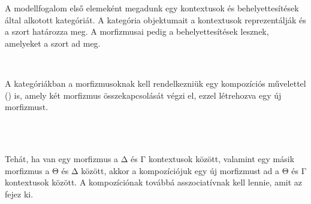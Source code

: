 A modellfogalom első elemeként megadunk egy kontextusok és behelyettesítések által alkotott kategóriát. A kategória objektumait a kontextusok reprezentálják és a  szort határozza meg. A morfizmusai pedig a behelyettesítések lesznek, amelyeket a  szort ad meg.
\begin{code}%
\>[3][@{}l@{\AgdaIndent{1}}]%
\>[6]\AgdaSpace{}%
\AgdaSymbol{:}\AgdaSpace{}%
\AgdaSpace{}%
\<%
\\
%
\>[6]\AgdaSpace{}%
\AgdaSymbol{:}\AgdaSpace{}%
\AgdaSpace{}%
\AgdaSpace{}%
\AgdaSpace{}%
\AgdaSpace{}%
\AgdaSpace{}%
\AgdaSymbol{(}\AgdaSpace{}%
\AgdaSpace{}%
\AgdaSymbol{)}\<%
\end{code}
A kategóriákban a morfizmusoknak kell rendelkezniük egy kompozíciós művelettel () is, amely két morfizmus összekapcsolását végzi el, ezzel létrehozva egy új morfizmust. 
\begin{code}%
%
\>[6]\AgdaSpace{}%
\AgdaSymbol{:}\AgdaSpace{}%
\AgdaSpace{}%
\AgdaSpace{}%
\AgdaSymbol{\}}\AgdaSpace{}%
\AgdaSpace{}%
\AgdaSpace{}%
\AgdaSpace{}%
\AgdaSpace{}%
\AgdaSpace{}%
\AgdaSpace{}%
\AgdaSpace{}%
\AgdaSpace{}%
\AgdaSpace{}%
\AgdaSpace{}%
\AgdaSpace{}%
\<%
\\
%
\>[6]\AgdaSpace{}%
\AgdaSymbol{:}%
\>[58I]\AgdaSpace{}%
\AgdaSpace{}%
\AgdaSpace{}%
\AgdaSymbol{\}\{}\AgdaSpace{}%
\AgdaSymbol{:}\AgdaSpace{}%
\AgdaSpace{}%
\AgdaSpace{}%
\AgdaSymbol{\}\{}\AgdaSpace{}%
\AgdaSymbol{:}\AgdaSpace{}%
\AgdaSpace{}%
\AgdaSpace{}%
\AgdaSymbol{\}\{}\AgdaSpace{}%
\AgdaSymbol{:}\AgdaSpace{}%
\AgdaSpace{}%
\AgdaSpace{}%
\AgdaSymbol{\}}\<%
\\
\>[.][@{}l@{}]\<[58I]%
\>[12]\AgdaSpace{}%
\AgdaSymbol{(}\AgdaSpace{}%
\AgdaSpace{}%
\AgdaSymbol{)}\AgdaSpace{}%
\AgdaSpace{}%
\AgdaSpace{}%
\AgdaSpace{}%
\AgdaSpace{}%
\AgdaSpace{}%
\AgdaSymbol{(}\AgdaSpace{}%
\AgdaSpace{}%
\AgdaSymbol{)}\<%
\end{code}
Tehát, ha van egy morfizmus a Δ és Γ kontextusok között, valamint egy másik morfizmus a Θ és Δ között, akkor a kompozíciójuk egy új morfizmust ad a Θ és Γ kontextusok között. A kompozíciónak továbbá asszociatívnak kell lennie, amit az  fejez ki.

